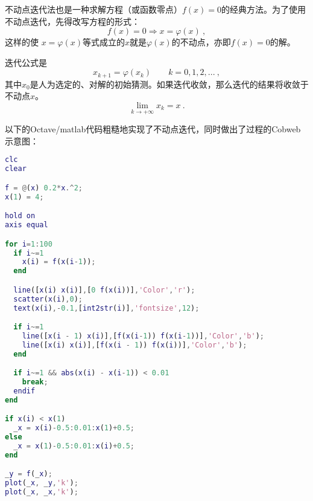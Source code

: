 

不动点迭代法也是一种求解方程（或函数零点）$f(x)=0$的经典方法。为了使用不动点迭代，先得改写方程的形式：
\begin{equation}
f(x)=0\Rightarrow x = \varphi(x)~,
\end{equation}
这样的使 $x = \varphi(x)$等式成立的$x$就是$\varphi(x)$的不动点，亦即$f(x)=0$的解。

迭代公式是
\begin{equation}
x_{k+1} = \varphi(x_k) \qquad k=0,1,2,...~,
\end{equation}
其中$x_0$是人为选定的、对解的初始猜测。如果迭代收敛，那么迭代的结果将收敛于不动点$x$。
$$\lim_{k\to+\infty} x_k = x~.$$

以下的Octave/matlab代码粗糙地实现了不动点迭代，同时做出了过程的Cobweb示意图：

\begin{lstlisting}[language=matlab]
clc
clear

f = @(x) 0.2*x.^2;
x(1) = 4;

hold on
axis equal

for i=1:100
  if i~=1
    x(i) = f(x(i-1));
  end

  line([x(i) x(i)],[0 f(x(i))],'Color','r');
  scatter(x(i),0);
  text(x(i),-0.1,[int2str(i)],'fontsize',12);

  if i~=1
    line([x(i - 1) x(i)],[f(x(i-1)) f(x(i-1))],'Color','b');
    line([x(i) x(i)],[f(x(i - 1)) f(x(i))],'Color','b');
  end

  if i~=1 && abs(x(i) - x(i-1)) < 0.01
    break;
  endif
end

if x(i) < x(1)
  _x = x(i)-0.5:0.01:x(1)+0.5;
else
  _x = x(1)-0.5:0.01:x(i)+0.5;
end

_y = f(_x);
plot(_x, _y,'k');
plot(_x, _x,'k');
\end{lstlisting}
